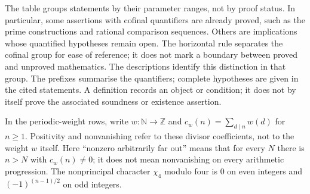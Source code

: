The table groups statements by their parameter ranges, not by proof
status. In particular, some assertions with cofinal quantifiers are
already proved, such as the prime constructions and rational comparison
sequences. Others are implications whose quantified hypotheses remain
open. The horizontal rule separates the cofinal group for ease of
reference; it does not mark a boundary between proved and unproved
mathematics. The descriptions identify this distinction in that group.
The prefixes summarise the quantifiers; complete hypotheses are given in
the cited statements. A definition records an object or condition; it does not by itself prove
the associated soundness or existence assertion.

\begingroup
In the periodic-weight rows, write
$w:\mathbb N\to\mathbb Z$ and
$c_w(n)=\sum_{d\mid n}w(d)$ for $n\ge1$. Positivity and nonvanishing
refer to these divisor coefficients, not to the weight $w$ itself.
Here ``nonzero arbitrarily far out'' means that for every $N$ there is
$n>N$ with $c_w(n)\ne0$; it does not mean nonvanishing on every
arithmetic progression. The nonprincipal character $\chi_4$ modulo four
is $0$ on even integers and $(-1)^{(n-1)/2}$ on odd integers.

